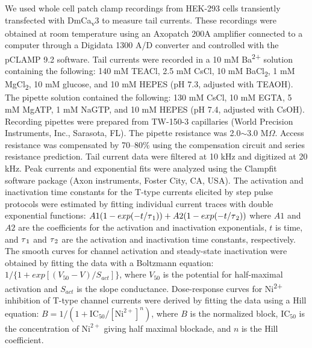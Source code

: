 We used whole cell patch clamp recordings from HEK-293 cells transiently transfected with DmCa\textsubscript{v}3 to measure tail currents. 
These recordings were obtained at room temperature using an Axopatch 200A amplifier connected to a computer through a Digidata 1300 A/D converter and controlled with the pCLAMP 9.2 software.
Tail currents were recorded in a 10 mM Ba\textsuperscript{2+} solution containing the following: 140 mM TEACl, 2.5 mM CsCl, 10 mM BaCl\textsubscript{2}, 1 mM MgCl\textsubscript{2}, 10 mM glucose, and 10 mM HEPES (pH 7.3, adjusted with TEAOH).
The pipette solution contained the following: 130 mM CsCl, 10 mM EGTA, 5 mM MgATP, 1 mM NaGTP, and 10 mM HEPES (pH 7.4, adjusted with CsOH). 
Recording pipettes were prepared from TW-150-3 capillaries (World Precision Instruments, Inc., Sarasota, FL).
The pipette resistance was 2.0$\sim$3.0 M$\Omega$.
Access resistance was compensated by 70--80\% using the compensation circuit and series resistance prediction.
Tail current data were filtered at 10 kHz and digitized at 20 kHz.
Peak currents and exponential fits were analyzed using the Clampfit software package (Axon instruments, Foster City, CA, USA).
The activation and inactivation time constants for the T-type currents elicited by step pulse protocols were estimated by fitting individual current traces with double exponential functions: $A1(1-exp(-t/\tau \textsubscript{1})) + A2(1-exp(-t/\tau\textsubscript{2}))$ where $A1$ and $A2$ are the coefficients for the activation and inactivation exponentials, $t$ is time, and $\tau\textsubscript{1}$ and $\tau\textsubscript{2}$ are the activation and inactivation time constants, respectively.
The smooth curves for channel activation and steady-state inactivation were obtained by fitting the data with a Boltzmann equation: $1/\{1+exp[(V_{50}-V)/S_{act}]\}$, where $V_{50}$ is the potential for half-maximal activation and $S_{act}$ is the slope conductance.
Dose-response curves for Ni\textsuperscript{2+} inhibition of T-type channel currents were derived by fitting the data using a Hill equation: $B = 1/(1 + \textrm{IC}_{50}/[\textrm{Ni}^{2+}]^n)$, where $B$ is the normalized block, $\textrm{IC}_{50}$ is the concentration of $\textrm{Ni}^{2+}$ giving half maximal blockade, and $n$ is the Hill coefficient.
